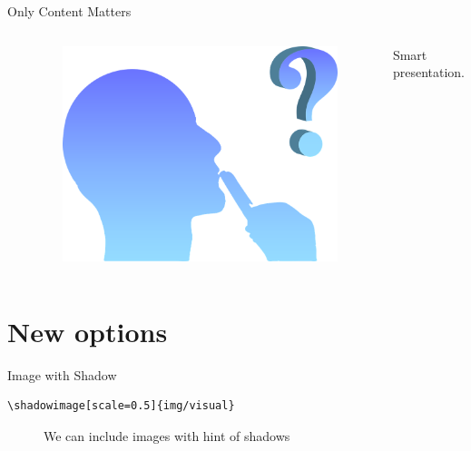 \documentclass[xetex, aspectratio=169]{beamer}
\begin{document}
\begin{frame}[fragile]{Only Content Matters}
\begin{columns}
{	}
	
	{
		\begin{figure}
			\includegraphics[scale=0.07]{img/smart}
		\end{figure}
	\begin{center}
		Smart presentation.
	\end{center}

	}
	
	\end{columns}
	

\end{frame}

\section{New options}

\begin{frame}[fragile]{Image with Shadow}
	

\begin{verbatim}
\shadowimage[scale=0.5]{img/visual}
\end{verbatim}

		\begin{figure}
			\caption{We can include images with hint of shadows}
		\end{figure}
	
\end{frame}
\end{document}
